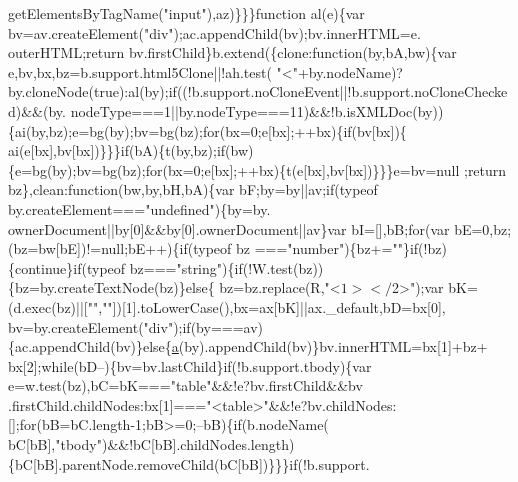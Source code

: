 \begin{DoxyCode}
{      getElementsByTagName(\textcolor{stringliteral}{"input"}),az)\}\}\}\textcolor{keyword}{function} al(e)\{var bv=av.createElement(\textcolor{stringliteral}{"div"});ac.appendChild(bv);bv.innerHTML=e.
      outerHTML;\textcolor{keywordflow}{return} bv.firstChild\}b.extend(\{clone:\textcolor{keyword}{function}(by,bA,bw)\{var e,bv,bx,bz=b.support.html5Clone||!ah.test(\textcolor{stringliteral}{
      "<"}+by.nodeName)?by.cloneNode(\textcolor{keyword}{true}):al(by);\textcolor{keywordflow}{if}((!b.support.noCloneEvent||!b.support.noCloneChecked)&&(by.
      nodeType===1||by.nodeType===11)&&!b.isXMLDoc(by))\{ai(by,bz);e=bg(by);bv=bg(bz);\textcolor{keywordflow}{for}(bx=0;e[bx];++bx)\{\textcolor{keywordflow}{if}(bv[bx])\{
      ai(e[bx],bv[bx])\}\}\}\textcolor{keywordflow}{if}(bA)\{t(by,bz);\textcolor{keywordflow}{if}(bw)\{e=bg(by);bv=bg(bz);\textcolor{keywordflow}{for}(bx=0;e[bx];++bx)\{t(e[bx],bv[bx])\}\}\}e=bv=null
      ;\textcolor{keywordflow}{return} bz\},clean:\textcolor{keyword}{function}(bw,by,bH,bA)\{var bF;by=by||av;\textcolor{keywordflow}{if}(typeof by.createElement===\textcolor{stringliteral}{"undefined"})\{by=by.
      ownerDocument||by[0]&&by[0].ownerDocument||av\}var bI=[],bB;\textcolor{keywordflow}{for}(var bE=0,bz;(bz=bw[bE])!=null;bE++)\{\textcolor{keywordflow}{if}(typeof bz
      ===\textcolor{stringliteral}{"number"})\{bz+=\textcolor{stringliteral}{""}\}\textcolor{keywordflow}{if}(!bz)\{\textcolor{keywordflow}{continue}\}\textcolor{keywordflow}{if}(typeof bz===\textcolor{stringliteral}{"string"})\{\textcolor{keywordflow}{if}(!W.test(bz))\{bz=by.createTextNode(bz)\}\textcolor{keywordflow}{else}\{
      bz=bz.replace(R,\textcolor{stringliteral}{"<$1></$2>"});var bK=(d.exec(bz)||[\textcolor{stringliteral}{""},\textcolor{stringliteral}{""}])[1].toLowerCase(),bx=ax[bK]||ax.\_default,bD=bx[0],
      bv=by.createElement(\textcolor{stringliteral}{"div"});\textcolor{keywordflow}{if}(by===av)\{ac.appendChild(bv)\}\textcolor{keywordflow}{else}\{\hyperlink{jquery_8js_aa4d4888597588a84fd5b1184d00c91f3}{a}(by).appendChild(bv)\}bv.innerHTML=bx[1]+bz+
      bx[2];\textcolor{keywordflow}{while}(bD--)\{bv=bv.lastChild\}\textcolor{keywordflow}{if}(!b.support.tbody)\{var e=w.test(bz),bC=bK===\textcolor{stringliteral}{"table"}&&!e?bv.firstChild&&bv
      .firstChild.childNodes:bx[1]===\textcolor{stringliteral}{"<table>"}&&!e?bv.childNodes:[];\textcolor{keywordflow}{for}(bB=bC.length-1;bB>=0;--bB)\{\textcolor{keywordflow}{if}(b.nodeName(
      bC[bB],\textcolor{stringliteral}{"tbody"})&&!bC[bB].childNodes.length)\{bC[bB].parentNode.removeChild(bC[bB])\}\}\}\textcolor{keywordflow}{if}(!b.support.
}
\end{DoxyCode}
